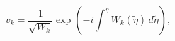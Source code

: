 \begin{equation}\label{eq:WKB}
  v_k=\frac{1}{\sqrt{W_k}}
  \exp\left(-i\int^\eta W_k(\tilde{\eta})\,d\tilde{\eta}\right),
\end{equation}

